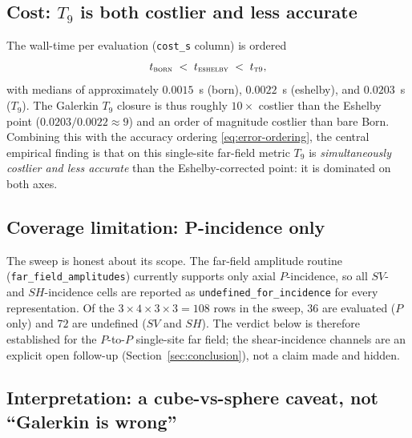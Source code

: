\documentclass[11pt,a4paper]{article}
\theoremstyle{plain}
\theoremstyle{definition}
\theoremstyle{remark}
\begin{document}
\subsection{Cost: $T_9$ is both costlier and less accurate}
\label{sec:evidence-cost}

The wall-time per evaluation (\texttt{cost\_s} column) is ordered
\begin{equation}
  t_{\textsc{born}}
  \;<\;
  t_{\textsc{eshelby}}
  \;<\;
  t_{\textsc{t9}},
  \label{eq:cost-ordering}
\end{equation}
with medians of approximately $0.0015$~s (born), $0.0022$~s (eshelby), and
$0.0203$~s ($T_9$).  The Galerkin $T_9$ closure is thus roughly $10\times$
costlier than the Eshelby point ($0.0203/0.0022 \approx 9$) and an order of
magnitude costlier than bare Born.  Combining this with the accuracy ordering
\eqref{eq:error-ordering}, the central empirical finding is that on this
single-site far-field metric $T_9$ is \emph{simultaneously costlier and less
accurate} than the Eshelby-corrected point: it is dominated on both axes.

\subsection{Coverage limitation: P-incidence only}
\label{sec:evidence-coverage}

The sweep is honest about its scope.  The far-field amplitude routine
(\texttt{far\_field\_amplitudes}) currently supports only axial $P$-incidence,
so all $SV$- and $SH$-incidence cells are reported as
\texttt{undefined\_for\_incidence} for every representation.  Of the
$3\times4\times3\times3 = 108$ rows in the sweep, $36$ are evaluated ($P$
only) and $72$ are undefined ($SV$ and $SH$).  The verdict below is therefore
established for the $P$-to-$P$ single-site far field; the shear-incidence
channels are an explicit open follow-up (Section~\ref{sec:conclusion}), not a
claim made and hidden.

\subsection{Interpretation: a cube-vs-sphere caveat, not ``Galerkin is wrong''}
\label{sec:evidence-caveat}
\end{document}
